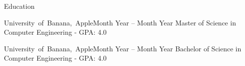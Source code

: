 \documentclass[]{mcdowellcv}
\begin{document}
\begin{cvsection}{Education}

    \begin{cvsubsection}{\mbox {University of Banana, Apple}}{}{Month Year -- Month Year}
        Master of Science in Computer Engineering - GPA: 4.0
    \end{cvsubsection}
    
    \begin{cvsubsection}{\mbox {University of Banana, Apple}}{}{Month Year -- Month Year}
        Bachelor of Science in Computer Engineering - GPA: 4.0
    \end{cvsubsection}
     
\end{cvsection}
\end{document}
